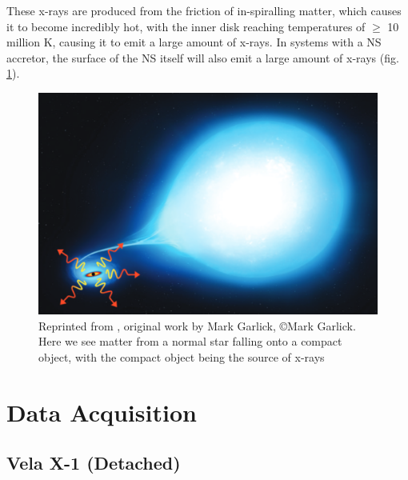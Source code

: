 \documentclass[12pt, a4paper]{article}
\begin{document}
            These x-rays are produced from the friction of in-spiralling matter, which causes it to become incredibly hot, with the inner disk reaching temperatures of $\geq$ 10 million K, causing it to emit a large amount of x-rays. In systems with a NS accretor, the surface of the NS itself will also emit a large amount of x-rays \parencite{TaurisvandenHeuvel+2023} (fig. \ref{XrayAccretionMarkVis}). 

            \begin{figure} [H]
                \centering
                \includegraphics[width=\textwidth]{figs/reused-figs/markGarlic-Xrayaccretion.png}
                \caption{Reprinted from \parencite{TaurisvandenHeuvel+2023}, original work by Mark Garlick, \copyright Mark Garlick. Here we see matter from a normal star falling onto a compact object, with the compact object being the source of x-rays}
                \label{XrayAccretionMarkVis}
            \end{figure}
        
\section{Data Acquisition}
    \subsection{Vela X-1 (Detached)} \label{velax1introduction}
    
\end{document}
